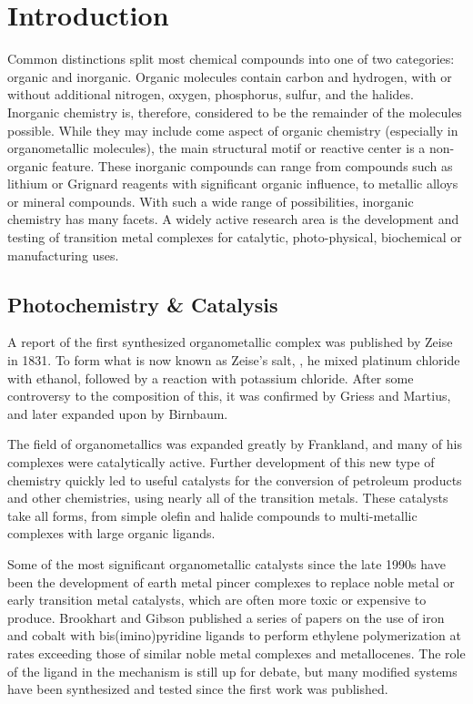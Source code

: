 \chapter{Introduction}

Common distinctions split most chemical compounds into one of two categories: organic and inorganic. Organic molecules contain carbon and hydrogen, with or without additional nitrogen, oxygen, phosphorus, sulfur, and the halides. Inorganic chemistry is, therefore, considered to be the remainder of the molecules possible. While they may include come aspect of organic chemistry (especially in organometallic molecules), the main structural motif or reactive center is a non-organic feature. These inorganic compounds can range from compounds such as lithium or Grignard reagents with significant organic influence, to metallic alloys or mineral compounds. With such a wide range of possibilities, inorganic chemistry has many facets. A widely active research area is the development and testing of transition metal complexes for catalytic, photo-physical, biochemical or manufacturing uses.

\section{Photochemistry \& Catalysis}

A report of the first synthesized organometallic complex was published by Zeise in 1831\autocite{zeise1831}. To form what is now known as Zeise's salt, , he mixed platinum chloride with ethanol, followed by a reaction with potassium chloride\autocite{hunt1984}. After some controversy to the composition of this, it was confirmed by Griess and Martius\autocite{griess1861}, and later expanded upon by Birnbaum\autocite{birnbaum1868}. 

The field of organometallics was expanded greatly by Frankland\autocite{hunt1984}, and many of his complexes were catalytically active. Further development of this new type of chemistry quickly led to useful catalysts for the conversion of petroleum products and other chemistries, using nearly all of the transition metals. These catalysts take all forms, from simple olefin and halide compounds to multi-metallic complexes with large organic ligands.

Some of the most significant organometallic catalysts since the late 1990s have been the development of earth metal pincer complexes to replace noble metal or early transition metal catalysts, which are often more toxic or expensive to produce. Brookhart and Gibson published a series of papers\autocite{small1998a, small1998b, britovsek1998, britovsek1999} on the use of iron and cobalt with bis(imino)pyridine ligands to perform ethylene polymerization at rates exceeding those of similar noble metal complexes and metallocenes\autocite{gibson2007}. The role of the ligand in the mechanism is still up for debate, but many modified systems have been synthesized and tested since the first work was published\autocite{boudier2014}.

